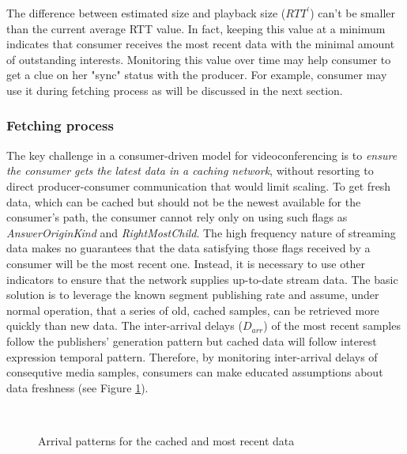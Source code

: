 \documentclass[10pt]{icn/sig-alternate-10pt} %
\begin{document}
The difference between estimated size and playback size ($RTT^{\prime}$) can't be smaller than the current average RTT value. In fact, keeping this value at a minimum indicates that consumer receives the most recent data with the minimal amount of outstanding interests. Monitoring this value over time may help consumer to get a clue on her "sync" status with the producer. For example, consumer may use it during fetching process as will be discussed in the next section. 

\subsubsection{Fetching process}

The key challenge in a consumer-driven model for videoconferencing is to \emph{ensure the consumer gets the latest data in a caching network}, without resorting to direct producer-consumer communication that would limit scaling. To get fresh data, which can be cached but should not be the newest available for the consumer's path,  the consumer cannot rely only on using such flags as \textit{AnswerOriginKind} and \textit{RightMostChild}. The high frequency nature of streaming data makes no guarantees that the data satisfying those flags received by a consumer will be the most recent one. Instead, it is necessary to use other indicators to ensure that the network supplies up-to-date stream data. The basic solution is to leverage the known segment publishing rate and assume, under normal operation, that a series of old, cached samples, can be retrieved more quickly than new data. The inter-arrival delays ($D_{arr}$) of the most recent samples follow the publishers' generation pattern but cached data will follow interest expression temporal pattern. Therefore, by monitoring inter-arrival delays of consequtive media samples, consumers can make educated assumptions about data freshness (see Figure \ref{fig:inter-arrival}).

\begin{figure}[t!]
\centering

\\

\caption{Arrival patterns for the cached and most recent data}
\label{fig:inter-arrival}
\end{figure}
\end{document}
